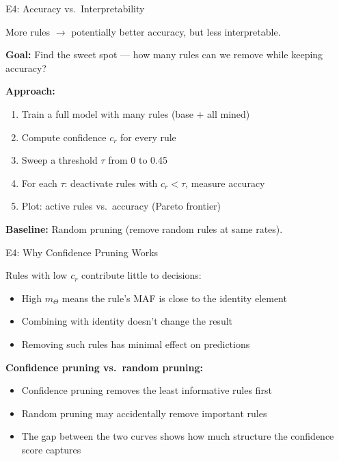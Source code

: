 \documentclass[aspectratio=169,12pt]{beamer}
\begin{document}
\begin{frame}{E4: Accuracy vs.\ Interpretability}

More rules $\rightarrow$ potentially better accuracy, but less interpretable.

\vspace{1em}
\textbf{Goal:} Find the sweet spot --- how many rules can we remove
while keeping accuracy?

\vspace{1.5em}
\textbf{Approach:}
\begin{enumerate}
    \item Train a full model with many rules (base + all mined)
    \item Compute confidence $c_r$ for every rule
    \item Sweep a threshold $\tau$ from 0 to 0.45
    \item For each $\tau$: deactivate rules with $c_r < \tau$, measure accuracy
    \item Plot: active rules vs.\ accuracy (Pareto frontier)
\end{enumerate}

\vspace{1em}
\textbf{Baseline:} Random pruning (remove random rules at same rates).

\end{frame}

\begin{frame}{E4: Why Confidence Pruning Works}

Rules with low $c_r$ contribute little to decisions:
\begin{itemize}
    \item High $m_\Theta$ means the rule's MAF is close to the identity element
    \item Combining with identity doesn't change the result
    \item Removing such rules has minimal effect on predictions
\end{itemize}

\vspace{1.5em}
\textbf{Confidence pruning vs.\ random pruning:}
\begin{itemize}
    \item Confidence pruning removes the least informative rules first
    \item Random pruning may accidentally remove important rules
    \item The gap between the two curves shows how much structure
          the confidence score captures
\end{itemize}

\end{frame}
\end{document}
